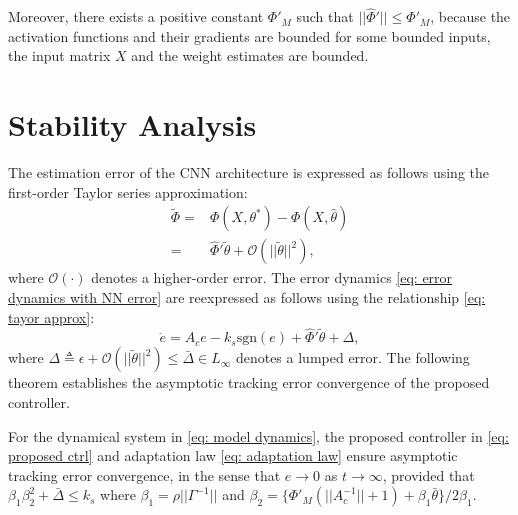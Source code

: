 \documentclass[letterpaper, 10 pt, conference]{ieeeconf}  %
\begin{document}
Moreover, there exists a positive constant $\Phi'_M$ such that $||\hat\Phi'||\le\Phi'_M$, because the activation functions and their gradients are bounded for some bounded inputs, the input matrix $X$ and the weight estimates are bounded. 

\section{Stability Analysis}

The estimation error of the CNN architecture is expressed as follows using the first-order Taylor series approximation:
\begin{align}\nonumber
        \tilde \Phi =& 
            \Phi(X,\theta^*)-\Phi(X,\hat\theta)
        \\
            =&\hat\Phi'\tilde \theta+\mathcal{O}(||\tilde \theta||^2),
    \label{eq: tayor approx}
\end{align}
where $\mathcal{O}(\cdot)$ denotes a higher-order error.
The error dynamics \eqref{eq: error dynamics with NN error} are reexpressed as follows using the relationship \eqref{eq: tayor approx}:
\begin{equation}
    \dot e = A_c e - k_s\text{sgn}(e)+\hat\Phi'\tilde \theta +\Delta,
\end{equation}
where $\Delta \triangleq \epsilon + \mathcal{O}(||\tilde\theta||^2)\le \bar\Delta\in L_\infty$ denotes a lumped error. 
The following theorem establishes the asymptotic tracking error convergence of the proposed controller.
\begin{theorem}
For the dynamical system in \eqref{eq: model dynamics}, the proposed controller in \eqref{eq: proposed ctrl} and adaptation law \eqref{eq: adaptation law} ensure asymptotic tracking error convergence, in the sense that $e\to0$ as $t\to \infty$, provided that $\beta_1\beta_2^2+ \bar\Delta \le k_s$ where 
$\beta_1=\rho||\Gamma^{-1}||$ and $\beta_2=\{\Phi'_M(||A_c^{-1}||+1)+\beta_1\bar\theta\}/2\beta_1$.

\end{theorem}
\end{document}
